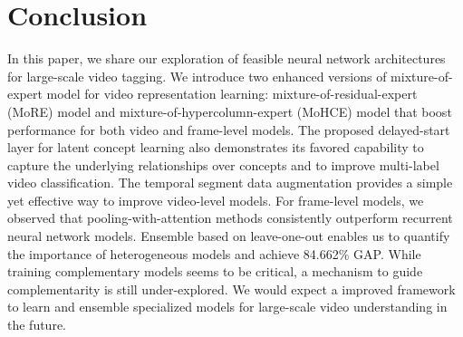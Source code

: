 \documentclass[10pt,twocolumn,letterpaper]{article}
\begin{document}
\section{Conclusion}
In this paper, we share our exploration of feasible neural network architectures for large-scale video tagging. We introduce two enhanced versions of mixture-of-expert model for video representation learning: mixture-of-residual-expert (MoRE) model and mixture-of-hypercolumn-expert (MoHCE) model that boost performance for both video and frame-level models. 
The proposed delayed-start layer for latent concept learning also demonstrates its favored capability to capture the underlying relationships over concepts and to improve multi-label video classification. The temporal segment data augmentation provides a simple yet effective way to improve video-level models. For frame-level models, we observed that pooling-with-attention methods consistently outperform recurrent neural network models. Ensemble based on leave-one-out  enables us to quantify the importance of heterogeneous models and achieve 84.662\% GAP. While training complementary models seems to be critical, a mechanism to guide complementarity is still under-explored. We would expect a improved framework to learn and ensemble specialized models for large-scale video understanding in the future.



{\small


}
\end{document}
